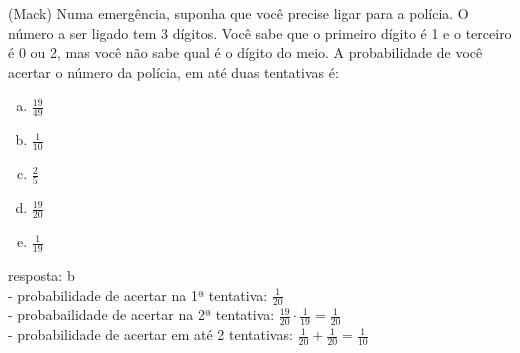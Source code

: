 \begin{ex}
(Mack) Numa emergência, suponha que você precise ligar para a polícia. O número a ser ligado tem 3 dígitos. Você sabe que o primeiro dígito é 1 e o terceiro é 0 ou 2, mas você não sabe qual é o dígito do meio. A probabilidade de você acertar o número da polícia, em até duas tentativas é:
   \begin{enumerate}[(a)]
   \item $\frac{19}{49}$
   \item $\frac{1}{10}$
   \item $\frac{2}{5}$
   \item $\frac{19}{20}$
   \item $\frac{1}{19}$
   \end{enumerate}
     \begin{sol}
       resposta: b \\
       - probabilidade de acertar na 1ª tentativa: $\frac{1}{20}$  \\
       - probabailidade de acertar na 2ª tentativa: $\frac{19}{20}\cdot \frac{1}{19}=\frac{1}{20}$ \\
      - probabilidade de acertar em até 2 tentativas: $\frac{1}{20}+\frac{1}{20}=\frac{1}{10}$
     \end{sol}
\end{ex}